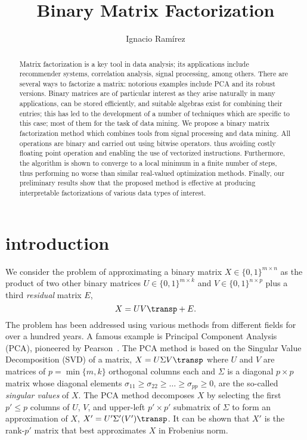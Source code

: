 \documentclass[a4paper]{IEEEtran}
\title{Binary Matrix Factorization}\author{Ignacio Ram\'{i}rez}
\begin{document}
\maketitle
\begin{abstract}
Matrix factorization is a key tool in data analysis; its applications include recommender systems, correlation analysis, signal processing, among others. There are several ways to factorize a matrix: notorious examples include PCA and its robust versions. Binary matrices are of particular interest as they arise naturally in many applications, can be stored   efficiently, and suitable algebras exist for combining their entries; this has led to the development  of a number of techniques which are specific to this case; most of them for the task of data mining.
We propose a binary matrix factorization method which combines tools from signal processing  and data mining. All operations are binary and carried out using bitwise operators. thus avoiding costly floating point operation and enabling the use of vectorized instructions. Furthermore, the algorithm is shown to converge to a local minimum in a finite number of steps,  thus performing no worse than similar real-valued optimization methods. Finally, our preliminary results show that the proposed method is effective at producing interpretable factorizations of various data types of interest.
\end{abstract}

\section{introduction}

We consider the problem of approximating a binary matrix $X \in \{0,1\}^{m{\times}n}$ as the product of two other binary matrices $U \in \{0,1\}^{m{\times}k}$ and $V \in \{0,1\}^{n{\times}p}$ plus a third \emph{residual} matrix $E$,
\begin{equation}
X = UV\transp + E.
\label{eq:mf}
\end{equation}
The problem  has been addressed using various methods from different fields for over a hundred years. A famous example is Principal Component Analysis (PCA), pioneered by Pearson~\cite{pearson01}. The PCA method is based on the Singular Value Decomposition (SVD) of a matrix, $X=U{\Sigma}V\transp$ where $U$ and $V$ are matrices of $p=\min\{m,k\}$  orthogonal columns each and $\Sigma$ is a diagonal $p{\times}p$ matrix whose diagonal elements $\sigma_{11} \geq \sigma_{22} \geq \ldots \geq \sigma_{pp} \geq 0$, are the so-called \emph{singular values} of $X$. The PCA method decomposes $X$ by selecting the first $p' \leq p$ columns of $U$, $V$, and upper-left $p'{\times}p'$ submatrix of $\Sigma$ to form an approximation of $X$, $X'=U'\Sigma'(V')\transp$. It can be shown that $X'$ is the rank-$p'$ matrix that best approximates $X$ in Frobenius norm.
\end{document}
